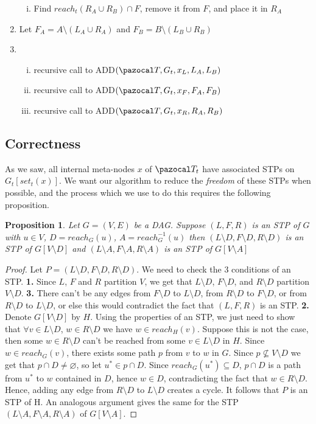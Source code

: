 \documentclass{report}
\newtheorem{proposition}[theorem]{Proposition}
\begin{document}
\begin{enumerate}
\begin{enumerate}[i.]
        \item Find $reach_{t}(R_{A} \cup R_{B}) \cap F$, remove it from $F$, and place it in $R_{A}$
        \end{enumerate}
    \item Let $F_{A}=A \setminus (L_{A} \cup R_{A})$ and $F_{B}=B \setminus (L_{B} \cup R_{B})$
    \item \begin{enumerate}[i.] 
        \item recursive call to ADD$(\pazocal T, G_t, x_{L},L_{A},L_{B})$
        \item recursive call to ADD$(\pazocal T,G_t, x_{F},F_{A},F_{B})$
        \item recursive call to ADD$(\pazocal T,G_t, x_{R},R_{A},R_{B})$
        \end{enumerate}
\end{enumerate}

\subsection{Correctness}

As we saw, all internal meta-nodes $x$ of $\pazocal T_t$ have associated STPs on $G_t[set_t(x)]$. We want our algorithm to reduce the \textit{freedom} of these STPs when possible, and the process which we use to do this requires the following proposition.

\begin{proposition}
Let $G=(V,E)$ be a DAG. Suppose $(L,F,R)$ is an STP of $G$ with $u \in V$, $D=reach_{G}(u)$, $A=reach_{G}^{-1}(u)$ then $(L\setminus D,F\setminus D,R\setminus D)$ is an STP of $G[V\setminus D]$ and $(L\setminus A,F\setminus A,R\setminus A)$ is an STP of $G[V\setminus A]$
\end{proposition}

\begin{proof}
Let $P=(L\setminus D,F\setminus D,R\setminus D)$. We need to check the 3 conditions of an STP. \textbf{1.} Since $L$, $F$ and $R$ partition $V$, we get that $L\setminus D$, $F\setminus D$, and $R\setminus D$ partition $V\setminus D$. \textbf{3.} There can't be any edges from $F\setminus D$ to $L\setminus D$, from $R\setminus D$ to $F\setminus D$, or from $R\setminus D$ to $L\setminus D$, or else this would contradict the fact that $(L,F,R)$ is an STP. \textbf{2.} Denote $G[V\setminus D]$ by $H$. Using the properties of an STP, we just need to show that $\forall v \in L \setminus D$, $w \in R \setminus D$ we have $w \in reach_{H}(v)$. Suppose this is not the case, then some $w \in R \setminus D$ can't be reached from some $v \in L \setminus D$ in $H$. Since $w \in reach_{G}(v)$, there exists some path $p$ from $v$ to $w$ in $G$. Since $p \nsubseteq V \setminus D$ we get that $p \cap D \neq \varnothing$, so let $u^{*} \in p \cap D$. Since $reach_{G}(u^{*}) \subseteq D$, $p \cap D$ is a path from $u^{*}$ to $w$ contained in $D$, hence $w \in D$, contradicting the fact that $w \in R \setminus D$. Hence, adding any edge from $R \setminus D$ to $L \setminus D$ creates a cycle. It follows that $P$ is an STP of H. An analogous argument gives the same for the STP $(L\setminus A,F\setminus A,R\setminus A)$ of $G[V\setminus A]$.
\end{proof}
\end{document}
